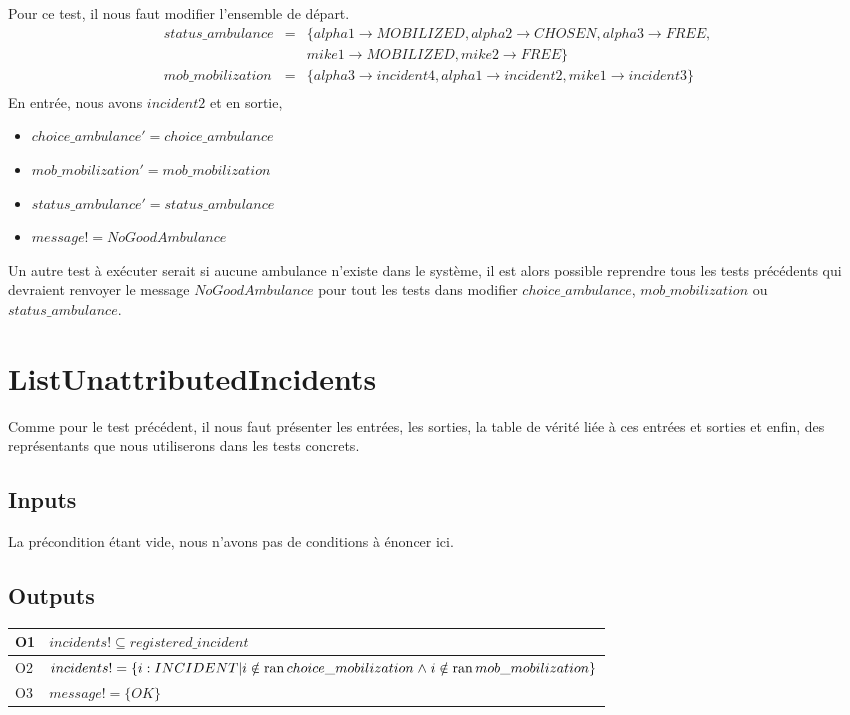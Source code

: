 \documentclass{report}
\begin{document}
Pour ce test, il nous faut modifier l'ensemble de départ.
\begin{eqnarray*}
status\_ambulance &=& \{alpha1 \rightarrow MOBILIZED, alpha2 \rightarrow CHOSEN, alpha3 \rightarrow FREE, \\ 
	&& mike1 \rightarrow MOBILIZED, mike2 \rightarrow FREE\} \\
mob\_mobilization &=& \{alpha3 \rightarrow incident4, alpha1 \rightarrow incident2, mike1 \rightarrow incident3\} \\
\end{eqnarray*}
En entrée, nous avons $incident2$ et en sortie, 
\begin{itemize}
	\item $choice\_ambulance' = choice\_ambulance$
	\item $mob\_mobilization' = mob\_mobilization$
	\item $status\_ambulance' = status\_ambulance$
	\item $message! = NoGoodAmbulance$
\end{itemize}

Un autre test à exécuter serait si aucune ambulance n'existe dans 
le système, il est alors possible reprendre tous les tests
précédents qui devraient renvoyer le message $NoGoodAmbulance$ pour tout
les tests dans modifier $choice\_ambulance$, $mob\_mobilization$ ou 
$status\_ambulance$.

\section{ListUnattributedIncidents}

Comme pour le test précédent, il nous faut présenter les entrées,
les sorties, la table de vérité liée à ces entrées et sorties et enfin, 
des représentants que nous utiliserons dans les tests concrets.

\subsection{Inputs}

La précondition étant vide, nous n'avons pas de conditions à énoncer ici.

\subsection{Outputs}

\noindent\begin{minipage}{\marginparsep+\marginparwidth+\marginparpush+\textwidth}
\begin{tabularx}{\textwidth}{|l|X|}
	\hline
	O1 & $incidents! \subseteq registered\_incident$ \\ \hline
	O2 & $incidents! = \{ i : INCIDENT | i \notin \mathop{\mathrm{ran}} choice\_mobilization \mathrel{\wedge} i \notin \mathop{\mathrm{ran}} mob\_mobilization \}$ \\ \hline
	O3 & $message! = \{OK\}$ \\ \hline
  	\hline
\end{tabularx}
\end{minipage}
\end{document}

